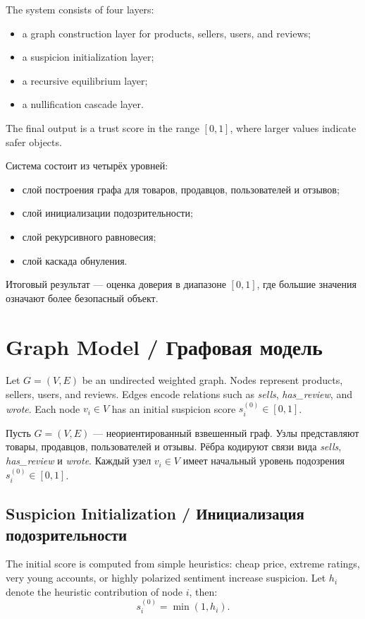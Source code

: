 \documentclass[12pt,a4paper]{article}
\begin{document}
The system consists of four layers:
\begin{itemize}
    \item a graph construction layer for products, sellers, users, and reviews;
    \item a suspicion initialization layer;
    \item a recursive equilibrium layer;
    \item a nullification cascade layer.
\end{itemize}
The final output is a trust score in the range $[0,1]$, where larger values indicate safer objects.

Система состоит из четырёх уровней:
\begin{itemize}
    \item слой построения графа для товаров, продавцов, пользователей и отзывов;
    \item слой инициализации подозрительности;
    \item слой рекурсивного равновесия;
    \item слой каскада обнуления.
\end{itemize}
Итоговый результат — оценка доверия в диапазоне $[0,1]$, где большие значения означают более безопасный объект.

\section{Graph Model / Графовая модель}

Let $G=(V,E)$ be an undirected weighted graph. Nodes represent products, sellers, users, and reviews. Edges encode relations such as \textit{sells}, \textit{has\_review}, and \textit{wrote}. Each node $v_i \in V$ has an initial suspicion score $s_i^{(0)} \in [0,1]$.

Пусть $G=(V,E)$ — неориентированный взвешенный граф. Узлы представляют товары, продавцов, пользователей и отзывы. Рёбра кодируют связи вида \textit{sells}, \textit{has\_review} и \textit{wrote}. Каждый узел $v_i \in V$ имеет начальный уровень подозрения $s_i^{(0)} \in [0,1]$.

\subsection{Suspicion Initialization / Инициализация подозрительности}

The initial score is computed from simple heuristics:
cheap price, extreme ratings, very young accounts, or highly polarized sentiment increase suspicion. Let $h_i$ denote the heuristic contribution of node $i$, then:
\[
s_i^{(0)} = \min(1, h_i).
\]
\end{document}
